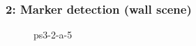 \documentclass[../main.tex]{subfiles}
\begin{document}
    \begin{frame}
        \frametitle{2: Marker detection (wall scene)}
        \begin{figure}[!htb]
            \centering
            \caption{ps3-2-a-5} 
        \end{figure}    
    \end{frame}
    
\end{document}
